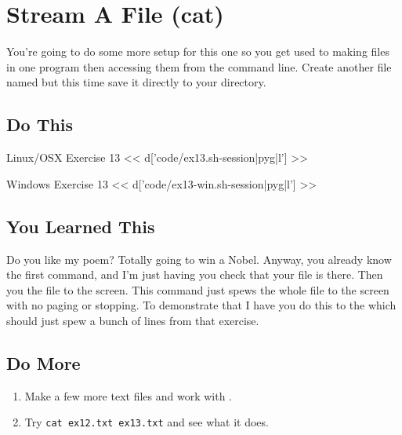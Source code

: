 \chapter{Stream A File (cat)}

You're going to do some more setup for this one so you get used to making files
in one program then accessing them from the command line.  Create another file
named  but this time save it directly to your 
directory.


\section{Do This}

\begin{code}{Linux/OSX Exercise 13}
<< d['code/ex13.sh-session|pyg|l'] >>
\end{code}

\begin{code}{Windows Exercise 13}
<< d['code/ex13-win.sh-session|pyg|l'] >>
\end{code}

\section{You Learned This}

Do you like my poem? Totally going to win a Nobel.  Anyway, you already know the first command, and I'm just having you check that your file is there.  Then you  the file to the screen.  This command just spews the whole file to the 
screen with no paging or stopping.  To demonstrate that I have you do this to the
 which should just spew a bunch of lines from that exercise.

\section{Do More}

\begin{enumerate}
\item Make a few more text files and work with .
\item Try \verb|cat ex12.txt ex13.txt| and see what it does.
\end{enumerate}

